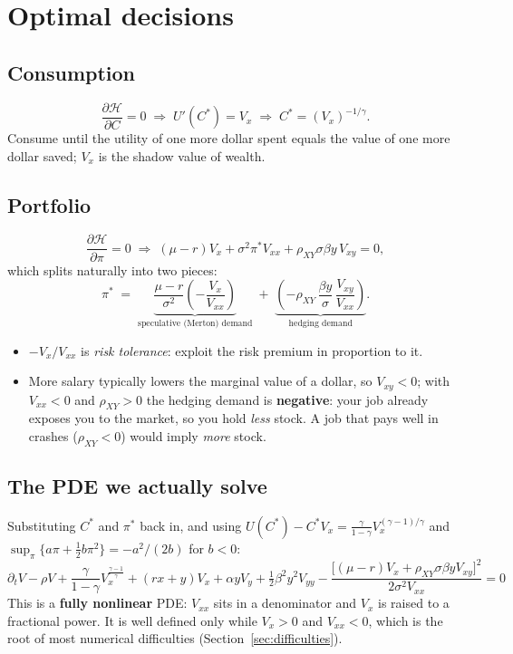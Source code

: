 \documentclass[11pt]{article}
\newcommand{\rxy}{\rho_{XY}}
\begin{document}
\section{Optimal decisions}

\subsection{Consumption}
\[
\frac{\partial\mathcal{H}}{\partial C}=0
\;\Longrightarrow\;
U'(C^*) = V_x
\;\Longrightarrow\;
C^* = (V_x)^{-1/\gamma}.
\]
Consume until the utility of one more dollar spent equals the value of one more
dollar saved; $V_x$ is the shadow value of wealth.

\subsection{Portfolio}
\[
\frac{\partial\mathcal{H}}{\partial \pi}=0
\;\Longrightarrow\;
(\mu-r)V_x + \sigma^2\pi^* V_{xx} + \rxy\sigma\beta y\,V_{xy} = 0,
\]
which splits naturally into two pieces:
\begin{equation}\label{eq:pistar}
\pi^* \;=\;
\underbrace{\frac{\mu-r}{\sigma^2}\left(-\frac{V_x}{V_{xx}}\right)}_{\text{speculative (Merton) demand}}
\;+\;
\underbrace{\left(-\rxy\,\frac{\beta y}{\sigma}\,\frac{V_{xy}}{V_{xx}}\right)}_{\text{hedging demand}} .
\end{equation}
\begin{itemize}
  \item $-V_x/V_{xx}$ is \emph{risk tolerance}: exploit the risk premium in
        proportion to it.
  \item More salary typically lowers the marginal value of a dollar, so $V_{xy}<0$;
        with $V_{xx}<0$ and $\rxy>0$ the hedging demand is \textbf{negative}: your
        job already exposes you to the market, so you hold \emph{less} stock. A job
        that pays well in crashes ($\rxy<0$) would imply \emph{more} stock.
\end{itemize}

\subsection{The PDE we actually solve}
Substituting $C^*$ and $\pi^*$ back in, and using
$U(C^*) - C^*V_x = \frac{\gamma}{1-\gamma}V_x^{(\gamma-1)/\gamma}$ and
$\sup_\pi\{a\pi+\tfrac12 b\pi^2\} = -a^2/(2b)$ for $b<0$:
\begin{equation}\label{eq:hjb-reduced}
\boxed{
\partial_tV - \rho V + \frac{\gamma}{1-\gamma}V_x^{\frac{\gamma-1}{\gamma}}
+ (rx+y)V_x + \alpha yV_y + \tfrac12\beta^2y^2V_{yy}
- \frac{\big[(\mu-r)V_x + \rxy\sigma\beta y V_{xy}\big]^2}{2\sigma^2 V_{xx}} = 0 }
\end{equation}
This is a \textbf{fully nonlinear} PDE: $V_{xx}$ sits in a denominator and $V_x$ is
raised to a fractional power. It is well defined only while $V_x>0$ and $V_{xx}<0$,
which is the root of most numerical difficulties (Section~\ref{sec:difficulties}).
\end{document}
